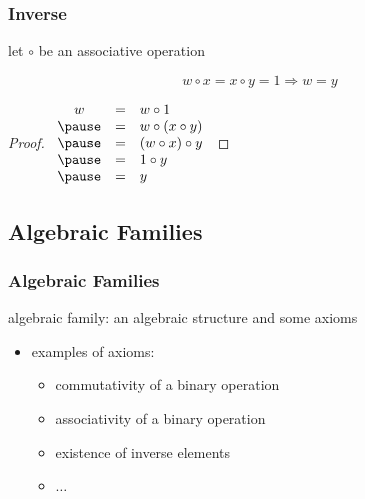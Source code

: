 \documentclass[dvipsnames]{beamer}
\begin{document}
\begin{frame}
  \frametitle{Inverse}

  \begin{theorem}
    let $\circ$ be an associative operation

    \[ w \circ x = x \circ y = 1 \Rightarrow w = y \]
  \end{theorem}

  \pause
  \begin{proof}
    $\begin{array}{ccl}
      w & = & w \circ 1\\ \pause
        & = & w \circ (x \circ y)\\ \pause
        & = & (w \circ x) \circ y\\ \pause
        & = & 1 \circ y\\ \pause
        & = & y
    \end{array}$
  \end{proof}
\end{frame}

\subsection{Algebraic Families}

\begin{frame}
  \frametitle{Algebraic Families}

  \begin{definition}
    \alert{algebraic family}: an algebraic structure and some axioms
  \end{definition}

  \begin{itemize}
    \item examples of axioms:
    \begin{itemize}
      \item commutativity of a binary operation
      \item associativity of a binary operation
      \item existence of inverse elements
      \item $\ldots$
    \end{itemize}
  \end{itemize}
\end{frame}
\end{document}
